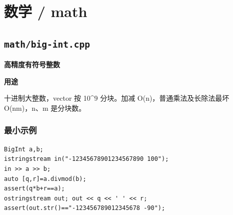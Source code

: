 \documentclass[UTF8,a4paper,10pt]{ctexart}
\newcommand{\TemplUsage}[1]{\textbf{用途}\par #1\par}
\begin{document}
\section{数学 / math}
\subsection{\texttt{math/big-int.cpp}}
\textbf{高精度有符号整数}\par
\TemplUsage{十进制大整数，vector 按 10\textasciicircum{}9 分块。加减 O(n)，普通乘法及长除法最坏 O(nm)，n、m 是分块数。}
\subsubsection*{最小示例}
\begin{lstlisting}
BigInt a,b;
istringstream in("-12345678901234567890 100");
in >> a >> b;
auto [q,r]=a.divmod(b);
assert(q*b+r==a);
ostringstream out; out << q << ' ' << r;
assert(out.str()=="-123456789012345678 -90");
\end{lstlisting}
\end{document}
